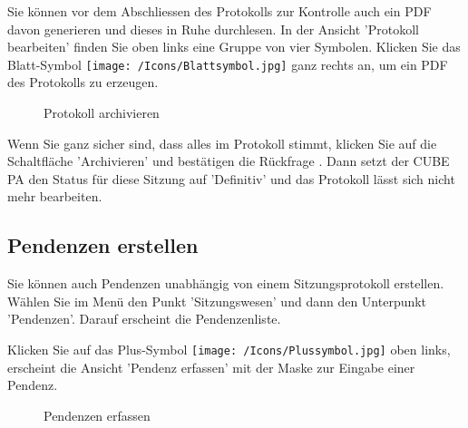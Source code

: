 \vspace{\baselineskip}

Sie können vor dem Abschliessen des Protokolls zur Kontrolle auch ein PDF davon generieren und dieses in Ruhe durchlesen. In der Ansicht 'Protokoll bearbeiten' finden Sie oben links eine Gruppe von vier Symbolen. Klicken Sie das Blatt-Symbol \texttt{[image: /Icons/Blattsymbol.jpg]}  ganz rechts an, um ein PDF des Protokolls zu erzeugen.

\begin{figure}[H]
\caption{Protokoll archivieren}
\end{figure}

Wenn Sie ganz sicher sind, dass alles im Protokoll stimmt, klicken Sie auf die Schaltfläche 'Archivieren'  und bestätigen die Rückfrage . Dann setzt der CUBE PA den Status für diese Sitzung auf 'Definitiv' und das Protokoll lässt sich nicht mehr bearbeiten.

\subsection{Pendenzen erstellen}

Sie können auch Pendenzen unabhängig von einem Sitzungsprotokoll erstellen. Wählen Sie im Menü den Punkt 'Sitzungswesen' und dann den Unterpunkt 'Pendenzen'. Darauf erscheint die Pendenzenliste.

\vspace{\baselineskip}

Klicken Sie auf das Plus-Symbol \texttt{[image: /Icons/Plussymbol.jpg]}  oben links, erscheint die Ansicht 'Pendenz erfassen' mit der Maske zur Eingabe einer Pendenz.

\begin{figure}[H]
\caption{Pendenzen erfassen}
\end{figure}

